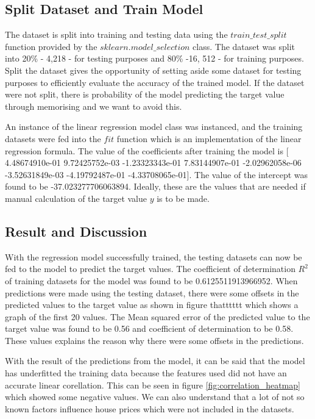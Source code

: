 \documentclass[conference]{IEEEtran}
\begin{document}
\subsection{Split Dataset and Train Model}
The dataset is split into training and testing data using the $train\_test\_split$ function provided by the $sklearn.model\_selection$ class. The dataset was split into 20\% - 4,218 - for testing purposes and 80\% -16, 512 - for training purposes. Split the dataset gives the opportunity of setting aside some dataset for testing purposes to efficiently evaluate the accuracy of the trained model. If the dataset were not split, there is probability of the model predicting the target value through memorising and we want to avoid this. 

An instance of the linear regression model class was instanced, and the training datasets were fed into the $fit$ function which is an implementation of the linear regression formula. The value of the coefficients after training the model is [ 4.48674910e-01  9.72425752e-03 -1.23323343e-01  7.83144907e-01
 -2.02962058e-06 -3.52631849e-03 -4.19792487e-01 -4.33708065e-01]. The value of the intercept was found to be -37.023277706063894. Ideally, these are the values that are needed if manual calculation of the target value $y$ is to be made. 

\subsection{Result and Discussion}
With the regression model successfully trained, the testing datasets can now be fed to the model to predict the target values. The coefficient of determination $R^2$ of training datasets for the model was found to be 0.6125511913966952.
When predictions were made using the testing dataset, there were some offsets in the predicted values to the target value as shown in figure thatttttt which shows a graph of the first 20 values. The Mean squared error of the predicted value to the target value was found to be 0.56 and coefficient of determination to be 0.58. These values explains the reason why there were some offsets in the predictions.

With the result of the predictions from the model, it can be said that the model has underfitted the training data because the features used did not have an accurate linear corellation. This can be seen in figure \ref{fig:correlation_heatmap} which showed some negative values. We can also understand that a lot of not so known factors influence house prices which were not included in the datasets.
\end{document}
